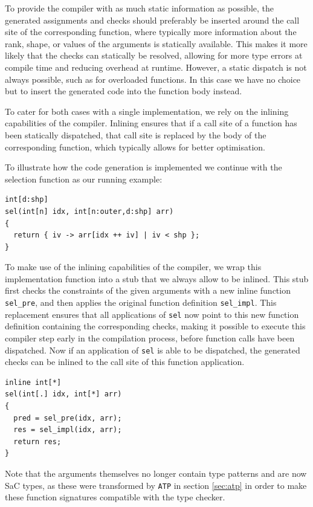\documentclass[sigconf,screen]{acmart}
\begin{document}
To provide the compiler with as much static information as possible, the generated assignments and checks should preferably be inserted around the call site of the corresponding function, where typically more information about the rank, shape, or values of the arguments is statically available.
This makes it more likely that the checks can statically be resolved, allowing for more type errors at compile time and reducing overhead at runtime.
However, a static dispatch is not always possible, such as for overloaded functions.
In this case we have no choice but to insert the generated code into the function body instead.

To cater for both cases with a single implementation, we rely on the inlining capabilities of the compiler.
Inlining ensures that if a call site of a function has been statically dispatched, that call site is replaced by the body of the corresponding function, which typically allows for better optimisation.

To illustrate how the code generation is implemented we continue with the selection function as our running example:

\begin{lstlisting}
int[d:shp]
sel(int[n] idx, int[n:outer,d:shp] arr)
{
  return { iv -> arr[idx ++ iv] | iv < shp };
}
\end{lstlisting}

To make use of the inlining capabilities of the compiler, we wrap this implementation function into a stub that we always allow to be inlined.
This stub first checks the constraints of the given arguments with a new inline function \texttt{sel\_pre}, and then applies the original function definition \texttt{sel\_impl}.
This replacement ensures that all applications of \texttt{sel} now point to this new function definition containing the corresponding checks, making it possible to execute this compiler step early in the compilation process, before function calls have been dispatched.
Now if an application of \texttt{sel} is able to be dispatched, the generated checks can be inlined to the call site of this function application.

\begin{lstlisting}
inline int[*]
sel(int[.] idx, int[*] arr)
{
  pred = sel_pre(idx, arr);
  res = sel_impl(idx, arr);
  return res;
}
\end{lstlisting}

Note that the arguments themselves no longer contain type patterns and are now SaC types, as these were transformed by \texttt{ATP} in section \ref{sec:atp} in order to make these function signatures compatible with the type checker.
\end{document}
